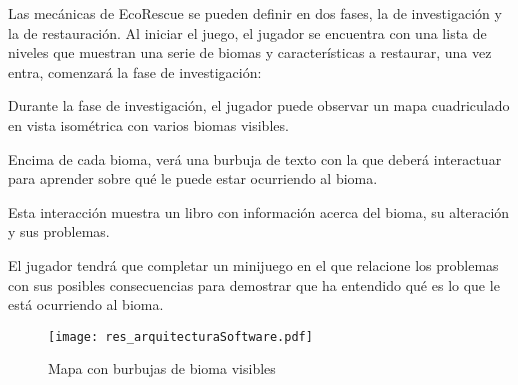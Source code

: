 Las mecánicas de EcoRescue se pueden definir en dos fases, la de investigación y la de restauración. Al iniciar el juego, el jugador se encuentra con una lista de niveles que muestran una serie de biomas y características a restaurar, una vez entra, comenzará la fase de investigación:
\begin{compactitem}
    \item Durante la fase de investigación, el jugador puede observar un mapa cuadriculado en vista isométrica con varios biomas visibles.
    \item Encima de cada bioma, verá una burbuja de texto con la que deberá interactuar para aprender sobre qué le puede estar ocurriendo al bioma.
    \item Esta interacción muestra un libro con información acerca del bioma, su alteración y sus problemas.
    \item El jugador tendrá que completar un minijuego en el que relacione los problemas con sus posibles consecuencias para demostrar que ha entendido qué es lo que le está ocurriendo al bioma.
\end{compactitem}

\begin{figure}
  \centering
	\texttt{[image: res\_arquitecturaSoftware.pdf]}
  \caption{Mapa con burbujas de bioma visibles}
\end{figure}

